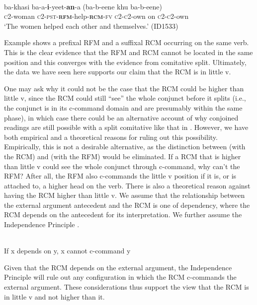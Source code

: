 \documentclass[output=paper]{langsci/langscibook}
\begin{document}
\ea\label{ex:}
  \\
\gll ba-khasi   ba-a-\textbf{i}-yeet-\textbf{an}-a     (ba-b-eene khu ba-b-eene) \\
\textsc{c}2-woman   \textsc{c2-pst-}\textbf{\textsc{rfm}}-help-\textbf{\textsc{rcm}}\textsc{-fv}   \textsc{c2-c}2-own on  \textsc{c2-c2}-own\\
\glt ‘The women helped each other and themselves.’ (ID1533)
\z


Example  shows a prefixal RFM and a suffixal RCM occurring on the same verb. This is the clear evidence that the RFM and RCM cannot be located in the same position and this converges with the evidence from comitative split. Ultimately, the data we have seen here supports our claim that the RCM is in little v. 

  One may ask why it could not be the case that the RCM could be higher than little v, since the RCM could still “see” the whole conjunct before it splits (i.e., the conjunct is in its c-command domain and are presumably within the same phase), in which case there could be an alternative account of why conjoined readings are still possible with a split comitative like that in . However, we have both empirical and a theoretical reasons for ruling out this possibility. Empirically, this is not a desirable alternative, as the distinction between  (with the RCM) and  (with the RFM) would be eliminated. If a RCM that is higher than little v could see the whole conjunct through c-command, why can't the RFM? After all, the RFM also c-commands the little v position if it is, or is attached to, a higher head on the verb. There is also a theoretical reason against having the RCM higher than little v. We assume that the relationship between the external argument antecedent and the RCM is one of dependency, where the RCM depends on the antecedent for its interpretation. We further assume the Independence Principle \citep{Safir2004}. 


\ea\label{ex:}
\\
  If x depends on y, x cannot c-command y
\z

Given that the RCM depends on the external argument, the Independence Principle will rule out any configuration in which the RCM c-commands the external argument. These considerations thus support the view that the RCM is in little v and not higher than it. 
\end{document}
